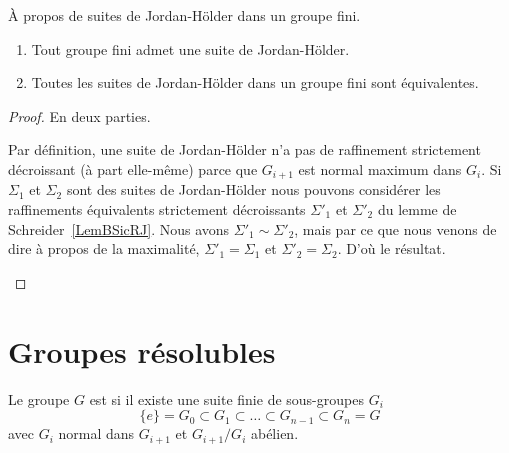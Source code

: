 \begin{theorem}\label{ThoLgxWIC}
	À propos de suites de Jordan-Hölder dans un groupe fini.
	\begin{enumerate}
		\item       \label{ITEMooRSDDooNHkFYO}
		      Tout groupe fini admet une suite de Jordan-Hölder.
		\item       \label{ITEMooGBOCooBAgnyt}
		      Toutes les suites de Jordan-Hölder dans un groupe fini sont équivalentes.
	\end{enumerate}
\end{theorem}

\begin{proof}
	En deux parties.
	\begin{subproof}

		Par définition, une suite de Jordan-Hölder n'a pas de raffinement strictement décroissant (à part elle-même) parce que \( G_{i+1}\) est normal maximum dans \( G_i\). Si \( \Sigma_1\) et \( \Sigma_2\) sont des suites de Jordan-Hölder nous pouvons considérer les raffinements équivalents strictement décroissants \( \Sigma'_1\) et \( \Sigma'_2\) du lemme de Schreider~\ref{LemBSicRJ}. Nous avons \( \Sigma'_1\sim\Sigma'_2\), mais par ce que nous venons de dire à propos de la maximalité, \( \Sigma'_1=\Sigma_1\) et \( \Sigma'_2=\Sigma_2\). D'où le résultat.
	\end{subproof}
\end{proof}

\section{Groupes résolubles}

\begin{definition}  \label{DefOSYNooTROIKs}
	Le groupe \( G\) est  si il existe une suite finie de sous-groupes \( G_i\)
	\begin{equation}
        \{ e \}=G_0\subset G_1\subset\ldots\subset G_{n-1}\subset G_n=G
	\end{equation}
    avec \( G_{i}\) normal dans \( G_{i+1}\) et \( G_{i+1}/G_i\) abélien.
\end{definition}

